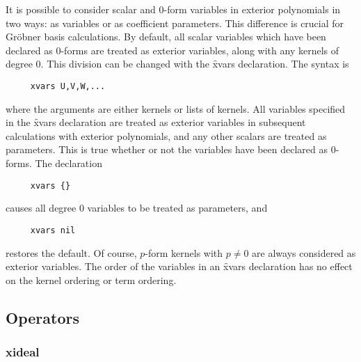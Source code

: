 \hypertarget{command:XVARS}{}
It is possible to consider scalar and 0-form variables in exterior
polynomials in two ways: as variables or as coefficient parameters. This
difference is crucial for Gr{\"o}bner basis calculations. By default, all
scalar variables which have been declared as 0-forms are treated as
exterior variables, along with any  kernels of degree 0. This
division can be changed with the \f{xvars}
declaration. The syntax is
\begin{verbatim}
     xvars U,V,W,...
\end{verbatim}
where the arguments are either kernels or lists of kernels. All variables
specified in the \f{xvars} declaration are treated as exterior variables in
subsequent  calculations with exterior polynomials, and any other
scalars are treated as parameters. This is true whether or not the
variables have been declared as 0-forms. The declaration
\begin{verbatim}
     xvars {}
\end{verbatim}
causes all degree 0 variables to be treated as parameters, and
\begin{verbatim}
     xvars nil
\end{verbatim}
restores the default. Of course, $p$-form kernels with $p\not=0$ are always
considered as exterior variables. The order of the variables in an
\f{xvars} declaration has no effect on the \REDUCE{} kernel ordering or
 term ordering.



\subsection{Operators}


\subsubsection*{xideal}

